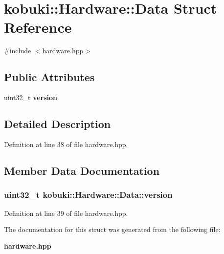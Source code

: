 \section{kobuki\-:\-:\-Hardware\-:\-:\-Data \-Struct \-Reference}
\label{structkobuki_1_1Hardware_1_1Data}


{\ttfamily \#include $<$hardware.\-hpp$>$}

\subsection*{\-Public \-Attributes}
\begin{DoxyCompactItemize}
\item 
uint32\-\_\-t {\bf version}
\end{DoxyCompactItemize}


\subsection{\-Detailed \-Description}


\-Definition at line 38 of file hardware.\-hpp.



\subsection{\-Member \-Data \-Documentation}
\subsubsection[{version}]{\setlength{\rightskip}{0pt plus 5cm}uint32\-\_\-t {\bf kobuki\-::\-Hardware\-::\-Data\-::version}}\label{structkobuki_1_1Hardware_1_1Data_ad8213b45a4780e33dfccc932f07aa0bc}


\-Definition at line 39 of file hardware.\-hpp.



\-The documentation for this struct was generated from the following file\-:\begin{DoxyCompactItemize}
\item 
{\bf hardware.\-hpp}\end{DoxyCompactItemize}
